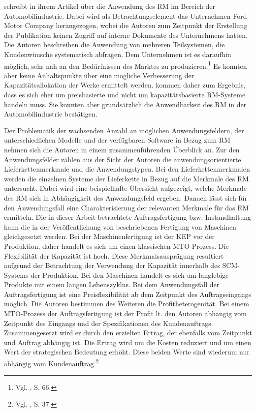 \cite{Specht:2008aa} schreibt in ihrem Artikel über die Anwendung des RM im Bereich der Automobilindustrie. Dabei wird als Betrachtungselement das Unternehmen \glqq Ford Motor {Company\grqq} herangezogen, wobei die Autoren zum Zeitpunkt der Erstellung der Publikation keinen Zugriff auf interne Dokumente des Unternehmens hatten. Die Autoren beschreiben die Anwendung von mehreren Teilsystemen, die Kundenwünsche systematisch abfragen. Dem Unternehmen ist es daraufhin möglich, sehr nah an den Bedürfnissen des Marktes zu produzieren.\footnote{Vgl. \cite{Specht:2008aa}, S. 66.} Es konnten aber keine Anhaltspunkte über eine mögliche Verbesserung der Kapazitätsallokation der Werke ermittelt werden. \cite{Specht:2008aa} kommen daher zum Ergebnis, dass es sich eher um preisbasierte und nicht um kapazitätsbasierte RM-Systeme handeln muss. Sie konnten aber grundsätzlich die Anwendbarkeit des RM in der Automobilindustrie bestätigen.

Der Problematik der wachsenden Anzahl an möglichen Anwendungsfeldern, der unterschiedlichen Modelle und der verfügbaren Software in Bezug zum RM nehmen sich die Autoren \cite{quante2009revenue} in einem zusammenführenden Überblick an. Zur den Anwendungsfelder zählen aus der Sicht der Autoren die anwendungsorientierte Lieferkettenmerkmale und die Anwendungstypen. Bei den Lieferkettenmerkmalen werden die einzelnen Systeme der Lieferkette in Bezug auf die Merkmale des RM untersucht. Dabei wird eine beispielhafte Übersicht aufgezeigt, welche Merkmale des RM sich in Abhängigkeit des Anwendungsfeld ergeben. Danach lässt sich für den Anwendungsfall eine Charakterisierung der relevanten Merkmale für das RM ermitteln. Die in dieser Arbeit betrachtete Auftragsfertigung bzw. Instandhaltung kann die in der Veröffentlichung von \cite{quante2009revenue} beschriebenen Fertigung von Maschinen gleichgesetzt werden. Bei der Maschinenfertigung ist der KEP vor der Produktion, daher handelt es sich um einen klassischen MTO-Prozess. Die Flexibilität der Kapazität ist hoch. Diese Merkmalsausprägung resultiert aufgrund der Betrachtung der Verwendung der Kapazität innerhalb des SCM-Systems der Produktion. Bei den Maschinen handelt es sich um langlebige Produkte mit einem langen Lebenszyklus. Bei dem Anwendungsfall der Auftragsfertigung ist eine Preisflexibilität ab dem Zeitpunkt des Auftragseingangs möglich. Die Autoren bestimmen des Weiteren die Profitheterogenität. Bei einem MTO-Prozess der Auftragsfertigung ist der Profit lt. den Autoren abhängig vom Zeitpunkt des Eingangs und der Spezifikationen des Kundenauftrags. Zusammengesetzt wird er durch den erzielten Ertrag, der ebenfalls vom Zeitpunkt und Auftrag abhängig ist. Die Ertrag wird um die Kosten reduziert und um einen Wert der strategischen Bedeutung erhöht. Diese beiden Werte sind wiederum nur abhängig vom Kundenauftrag.\footnote{Vgl. \cite{quante2009revenue}, S. 37.}

